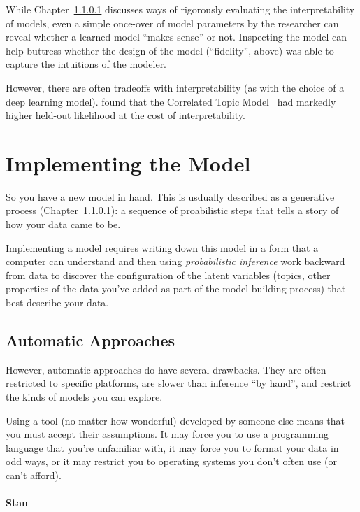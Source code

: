 While Chapter~\ref{} discusses ways of rigorously evaluating the
interpretability of models, even a simple once-over of model
parameters by the researcher can reveal whether a learned model
``makes sense'' or not.  Inspecting the model can help buttress
whether the design of the model (``fidelity'', above) was able to
capture the intuitions of the modeler.

However, there are often tradeoffs with interpretability (as with the
choice of a deep learning model).  \citet{} found that the Correlated
Topic Model~\citep{} had markedly higher held-out likelihood at the
cost of interpretability.

\section{Implementing the Model}

So you have a new model in hand.  This is usdually described as a
generative process (Chapter~\ref{}): a sequence of proabilistic steps
that tells a story of how your data came to be.

Implementing a model requires writing down this model in a form that a
computer can understand and then using \emph{probabilistic inference}
work backward from data to discover the configuration of the latent
variables (topics, other properties of the data you've added as part
of the model-building process) that best describe your data.

\subsection{Automatic Approaches}

However, automatic approaches do have several drawbacks.  They are
often restricted to specific platforms, are slower than inference ``by
hand'', and restrict the kinds of models you can explore.

Using a tool (no matter how wonderful) developed by someone else means
that you must accept their assumptions.  It may force you to use a
programming language that you're unfamiliar with, it may force you to
format your data in odd ways, or it may restrict you to operating
systems you don't often use (or can't afford).


\paragraph{Stan}


